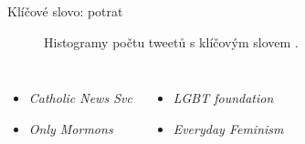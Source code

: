 \documentclass[notheorems,12pt]{beamer}
\begin{document}
\begin{frame}{Klíčové slovo: potrat}
    \begin{figure}
        \centering
        \vspace{-0.7cm}
        \caption*{Histogramy počtu tweetů s klíčovým slovem \textit{}.}
    \end{figure}
    \begin{columns}
    \column{6cm}
    	\begin{itemize}
    		\item \textit{Catholic News Svc}
    		\item \textit{Only Mormons}
    	\end{itemize}
    \column{6cm}
    	\begin{itemize}
    		\item \textit{LGBT foundation}
    		\item \textit{Everyday Feminism}
    	\end{itemize}
    \end{columns}
\end{frame}
\end{document}
